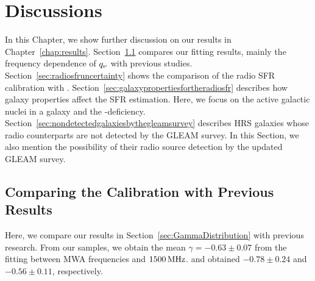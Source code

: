 \chapter{Discussions}\label{chap:discussions}
\begin{chapabstract}

In this Chapter, we show further discussion on our results in Chapter~\ref{chap:results}.
Section~\ref{sec:comparingthecalibration} compares our fitting results, mainly the frequency dependence of $q_{\nu}$ with previous studies.
Section~\ref{sec:radiosfruncertainty} shows the comparison of the radio SFR calibration with \citet{CalistroRivera2017a}.
Section~\ref{sec:galaxypropertiesfortheradiosfr} describes how galaxy properties affect the SFR estimation.
Here, we focus on the active galactic nuclei in a galaxy and the \nh-deficiency.
Section~\ref{sec:nondetectedgalaxiesbythegleamsurvey} describes HRS galaxies whose radio counterparts are not detected by the GLEAM survey.
In this Section, we also mention the possibility of their radio source detection by the updated GLEAM survey.

\end{chapabstract}

\section{Comparing the Calibration with Previous Results}\label{sec:comparingthecalibration}

Here, we compare our results in Section~\ref{sec:GammaDistribution} with previous research.
From our samples, we obtain the mean $\gamma=-0.63 \pm 0.07$ from the fitting between MWA frequencies and $1500\,\mathrm{MHz}$.
\citet{CalistroRivera2017a} and \citet{Chyzy2018} obtained $-0.78 \pm 0.24$ and $-0.56 \pm 0.11$, respectively.

